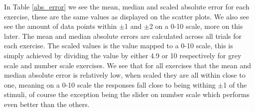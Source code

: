 In Table \ref{abs_error} we see the mean, median and scaled absolute error for each exercise, these are the same values as displayed on the scatter plots. We also see see the amount of data points within $\pm$1 and $\pm$2 on a 0-10 scale, more on this later. The mean and median absolute errors are calculated across all trials for each exercise. The scaled values is the value mapped to a 0-10 scale, this is simply achieved by dividing the value by either 4.9 or 10 respectively for grey scale and number scale exercises. We see that for all exercises that the mean and median absolute error is relatively low, when scaled they are all within close to one, meaning on a 0-10 scale the responses fall close to being withing $\pm$1 of the stimuli, of course the exception being the slider on number scale which performs even better than the others.

